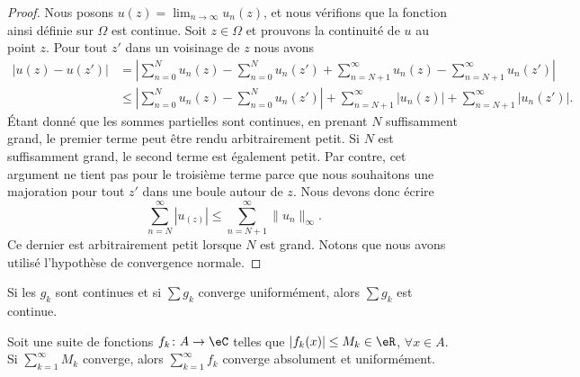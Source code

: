 \begin{proof}
    Nous posons \( u(z)=\lim_{n\to \infty} u_n(z)\), et nous vérifions que la fonction ainsi définie sur \( \Omega\) est continue. Soit \( z\in \Omega\) et prouvons la continuité de \( u\) au point \( z\). Pour tout \( z'\) dans un voisinage de \( z\) nous avons 
    \begin{subequations}
        \begin{align}
            \big| u(z)-u(z') \big|&=\left| \sum_{n=0}^{N}u_n(z)-\sum_{n=0}^{N}u_n(z')+\sum_{n=N+1}^{\infty}u_n(z)-\sum_{n=N+1}^{\infty}u_n(z') \right| \\
            &\leq \left| \sum_{n=0}^N u_n(z)-\sum_{n=0}^Nu_n(z') \right| +\sum_{n=N+1}^{\infty}| u_n(z) |+\sum_{n=N+1}^{\infty}| u_n(z') |.
        \end{align}
    \end{subequations}
    Étant donné que les sommes partielles sont continues, en prenant \( N\) suffisamment grand, le premier terme peut être rendu arbitrairement petit. Si \( N\) est suffisamment grand, le second terme est également petit. Par contre, cet argument ne tient pas pour le troisième terme parce que nous souhaitons une majoration pour tout \( z'\) dans une boule autour de \( z\). Nous devons donc écrire
    \begin{equation}
        \sum_{n=N}^{\infty}| u_(z) |\leq \sum_{n=N+1}^{\infty}\| u_n \|_{\infty}.
    \end{equation}
    Ce dernier est arbitrairement petit lorsque \( N\) est grand. Notons que nous avons utilisé l'hypothèse de convergence normale.
\end{proof}

\begin{theorem}			\label{ThoSerUnifCont}
	Si les $g_k$ sont continues et si $\sum g_k$ converge uniformément, alors $\sum g_k$ est continue.
\end{theorem}

\begin{theorem}		\label{ThoCritWeierstrass}
	Soit une suite de fonctions $f_k\colon A\to \eC$ telles que $| f_k(x) |\leq M_k\in\eR$, $\forall x\in A$. Si $\sum_{k=1}^{\infty}M_k$ converge, alors $\sum_{k=1}^{\infty}f_k$ converge absolument et uniformément.
\end{theorem}

